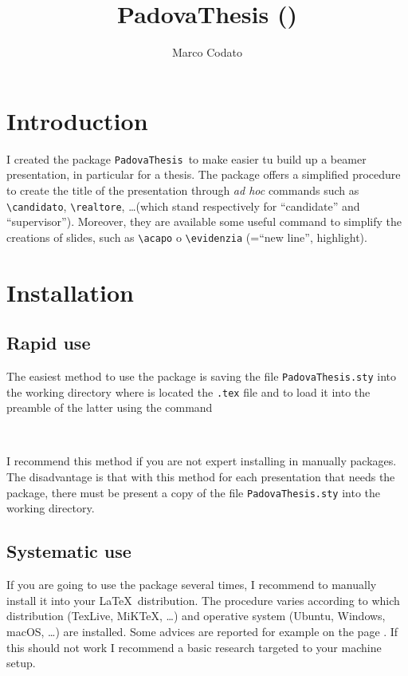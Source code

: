 \documentclass{article}
\title{PadovaThesis (\versione)}
\author{Marco Codato}
\newcommand{\Comando}[1]{\texttt{\textbackslash #1}}
\newcommand{\PadovaThesis}{\texttt{PadovaThesis}}
\begin{document}
\maketitle

\tableofcontents

\section{Introduction}
I created the package \PadovaThesis\ to make easier tu build up a beamer presentation, in particular for a thesis. The package offers a simplified procedure to create the title of the presentation through \textit{ad hoc} commands such as \Comando{candidato}, \Comando{realtore}, \dots (which stand respectively for ``candidate'' and ``supervisor''). Moreover, they are available some useful command to simplify the creations of slides, such as \Comando{acapo} o \Comando{evidenzia} (=``new line'', highlight).

\section{Installation}

\subsection{Rapid use}
The easiest method to use the package is saving the file \texttt{PadovaThesis.sty} into the working directory where is located the \texttt{.tex} file and to load it into the preamble of the latter using the command
\begin{verbatim}
	
\end{verbatim}
I recommend this method if you are not expert installing in manually packages. The disadvantage is that with this method for each presentation that needs the package, there must be present a copy of the file \texttt{PadovaThesis.sty} into the working directory.

\subsection{Systematic use}
If you are going to use the package several times, I recommend to manually install it into your \LaTeX\ distribution. The procedure varies according to which distribution (TexLive, MiKTeX, \dots) and operative system (Ubuntu, Windows, macOS, \dots) are installed. Some advices are reported for example on the page \cite{web:wikibooks:install_packages}. If this should not work I recommend a basic research targeted to your machine setup.
\end{document}
